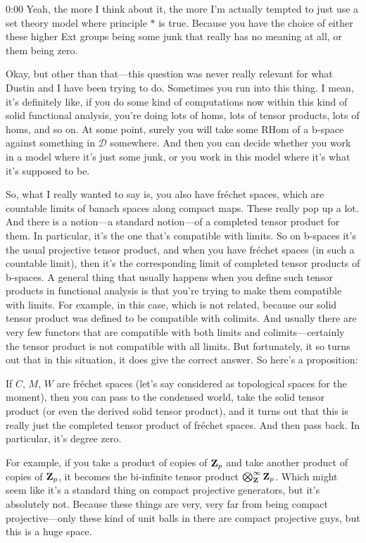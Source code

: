 \begin{unfinished}{0:00}
Yeah, the more I think about it, the more I'm actually tempted to just use a set theory model where principle $*$ is true. Because you have the choice of either these higher Ext groups being some junk that really has no meaning at all, or them being zero.

Okay, but other than that---this question was never really relevant for what Dustin and I have been trying to do. Sometimes you run into this thing. I mean, it's definitely like, if you do some kind of computations now within this kind of solid functional analysis, you're doing lots of homs, lots of tensor products, lots of homs, and so on. At some point, surely you will take some RHom of a b-space against something in $\mathcal{D}$ somewhere. And then you can decide whether you work in a model where it's just some junk, or you work in this model where it's what it's supposed to be.

So, what I really wanted to say is, you also have fréchet spaces, which are countable limits of banach spaces along compact maps. These really pop up a lot. And there is a notion---a standard notion---of a completed tensor product for them. In particular, it's the one that's compatible with limits. So on b-spaces it's the usual projective tensor product, and when you have fréchet spaces (in such a countable limit), then it's the corresponding limit of completed tensor products of b-spaces. A general thing that usually happens when you define such tensor products in functional analysis is that you're trying to make them compatible with limits. For example, in this case, which is not related, because our solid tensor product was defined to be compatible with colimits. And usually there are very few functors that are compatible with both limits and colimits---certainly the tensor product is not compatible with all limits. But fortunately, it so turns out that in this situation, it does give the correct answer. So here's a proposition:

If $C$, $M$, $W$ are fréchet spaces (let's say considered as topological spaces for the moment), then you can pass to the condensed world, take the solid tensor product (or even the derived solid tensor product), and it turns out that this is really just the completed tensor product of fréchet spaces. And then pass back. In particular, it's degree zero.

For example, if you take a product of copies of $\mathbf Z_p$ and take another product of copies of $\mathbf Z_p$, it becomes the bi-infinite tensor product $\bigotimes_\mathbf Z^{\infty} \mathbf Z_p$. Which might seem like it's a standard thing on compact projective generators, but it's absolutely not. Because these things are very, very far from being compact projective---only these kind of unit balls in there are compact projective guys, but this is a huge space.


\end{unfinished}
